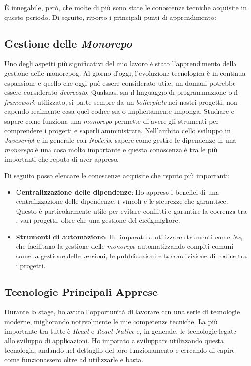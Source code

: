 È innegabile, però, che molte di più sono state le conoscenze tecniche acquisite in questo periodo.
Di seguito, riporto i principali punti di apprendimento:

\subsection{Gestione delle \textit{Monorepo}}

Uno degli aspetti più significativi del mio lavoro è stato l'apprendimento della gestione delle \gls{monorepog}\glox.
Al giorno d'oggi, l'evoluzione tecnologica è in continua espansione e quello che oggi può essere considerato utile, un domani potrebbe essere considerato \textit{deprecato}.
 Qualsiasi sia il linguaggio di programmazione o il \textit{framework} utilizzato, si parte sempre da un \textit{boilerplate} nei nostri progetti, non capendo realmente cosa quel codice sia o implicitamente imponga.
 Studiare e sapere come funziona una \textit{monorepo} permette di avere gli strumenti per comprendere i progetti e saperli amministrare.
 Nell'ambito dello sviluppo in \textit{Javascript} e in generale con \textit{Node.js}, sapere come gestire le dipendenze in una \textit{monorepo} è una cosa molto importante e questa conoscenza è tra le più importanti che reputo di aver appreso.

Di seguito posso elencare le conoscenze acquisite che reputo più importanti:

\begin{itemize}
    \item \textbf{Centralizzazione delle dipendenze}: Ho appreso i benefici di una centralizzazione delle dipendenze, i vincoli e le sicurezze che garantisce. Questo è particolarmente utile per evitare conflitti e garantire la coerenza tra i vari progetti, oltre che una gestione del \gls{cicdg}\glox migliore.
    \item \textbf{Strumenti di automazione}: Ho imparato a utilizzare strumenti come \textit{Nx}, che facilitano la gestione delle \textit{monorepo} automatizzando compiti comuni come la gestione delle versioni, le pubblicazioni e la condivisione di codice tra i progetti.
\end{itemize}

\subsection{Tecnologie Principali Apprese}

Durante lo stage, ho avuto l'opportunità di lavorare con una serie di tecnologie moderne, migliorando notevolmente le mie competenze tecniche.
La più importante tra tutte è \textit{React} e \textit{React Native} e, in generale, le tecnologie legate allo sviluppo di applicazioni.
Ho imparato a sviluppare utilizzando questa tecnologia, andando nel dettaglio del loro funzionamento e cercando di capire come funzionassero oltre ad utilizzarle e basta.

